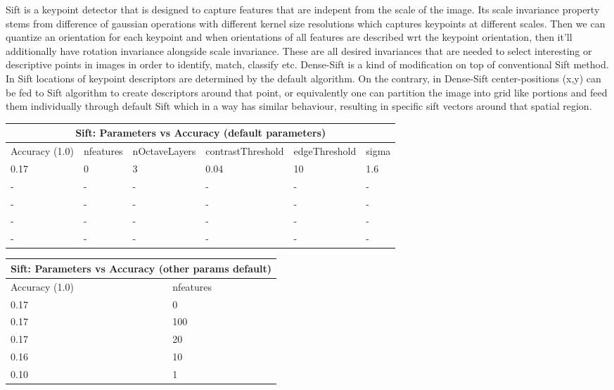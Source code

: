 \documentclass[12pt]{article}
\begin{document}
    \vspace*{0.5cm}
    \begin{center}
        \raggedright
        Sift is a keypoint detector that is designed to capture features that are indepent from the scale of the image.
        Its scale invariance property stems from difference of gaussian operations with different kernel size resolutions which captures keypoints at different scales.
        Then we can quantize an orientation for each keypoint and when orientations of all features are described wrt the keypoint orientation, then it'll additionally have rotation invariance alongside scale invariance.
        These are all desired invariances that are needed to select interesting or descriptive points in images in order to identify, match, classify etc.
        Dense-Sift is a kind of modification on top of conventional Sift method. In Sift locations of keypoint descriptors are determined by the default algorithm.
        On the contrary, in Dense-Sift center-positions (x,y) can be fed to Sift algorithm to create descriptors around that point, or equivalently one can partition the image into grid like portions 
        and feed them individually through default Sift which in a way has similar behaviour, resulting in specific sift vectors around that spatial region.
    \end{center}
    
    \vspace*{0.5cm}
        \begin{tabular}{ |p{1.5cm}||p{3cm}|p{3cm}|p{3cm}|p{3cm}|p{2cm}|  }
            \hline
            \multicolumn{6}{|c|}{Sift: Parameters vs Accuracy (default parameters)} \\
            \hline
            Accuracy (1.0) & nfeatures & nOctaveLayers & contrastThreshold & edgeThreshold & sigma \\
            \hline
            0.17 & 0 & 3 & 0.04 & 10 & 1.6 \\
            \hline
            - & - & - & - & - & - \\
            \hline
            - & - & - & - & - & - \\
            \hline
            - & - & - & - & - & - \\
            \hline
            - & - & - & - & - & - \\
            \hline
        \end{tabular}
    
        \vspace*{0.5cm}
    \begin{tabular}{ |p{1.5cm}||p{2cm}| }
        \hline
        \multicolumn{2}{|c|}{Sift: Parameters vs Accuracy (other params default)} \\
        \hline
        Accuracy (1.0) & nfeatures \\
        \hline
        0.17 & 0 \\
        \hline
        0.17 & 100 \\
        \hline
        0.17 & 20 \\
        \hline
        0.16 & 10 \\
        \hline
        0.10 & 1 \\
        \hline
    \end{tabular}
\end{document}
